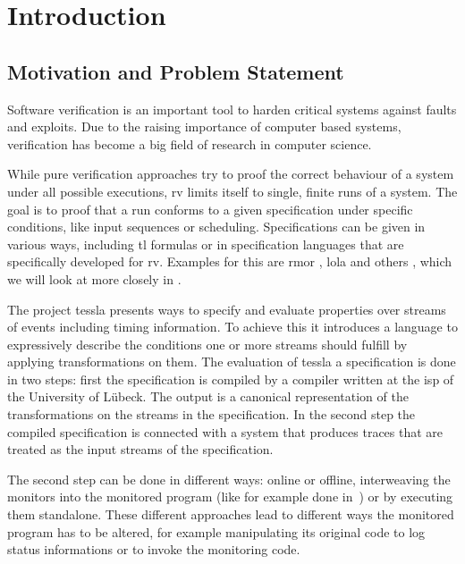 %
\chapter{Introduction}
\label{sec:intro}


\section{Motivation and Problem Statement}
\label{sec:intro:motivation}

Software verification is an important tool to harden critical systems against faults and exploits.
Due to the raising importance of computer based systems, verification has become a big field of research in computer science.

While pure verification approaches try to proof the correct behaviour of a system under all possible executions, \gls{rv} limits itself to single, finite runs of a system.
The goal is to proof that a run conforms to a given specification under specific conditions, like input sequences or scheduling.
Specifications can be given in various ways, including \gls{tl} formulas or in specification languages that are specifically developed for \gls{rv}.
Examples for this are \gls{rmor} \citep{Havelund2008}, \gls{lola} \citep{DAngelo2005} and others \citep{Zheng2015, Pike2010, Mostafa2015}, which we will look at more closely in .

The project \Gls{tessla}\citep{Decker2016} presents ways to specify and evaluate properties over streams of events including timing information.
To achieve this it introduces a language to expressively describe the conditions one or more streams should fulfill by applying transformations on them.
The evaluation of \gls{tessla} a specification is done in two steps: first the specification is compiled by a compiler written at the \gls{isp} of the University of Lübeck.
The output is a canonical representation of the transformations on the streams in the specification.
In the second step the compiled specification is connected with a system that produces traces that are treated as the input streams of the specification.

The second step can be done in different ways: online or offline, interweaving the monitors into the monitored program (like for example done in~\cite{Havelund2008}) or by executing them standalone.
These different approaches lead to different ways the monitored program has to be altered, for example manipulating its original code to log status informations or to invoke the monitoring code.

